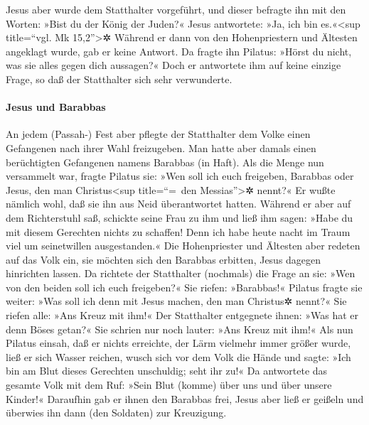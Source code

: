  Jesus aber wurde dem Statthalter vorgeführt, und dieser
befragte ihn mit den Worten: »Bist du der König der Juden?« Jesus
antwortete: »Ja, ich bin es.«\textless sup title=``vgl. Mk
15,2''\textgreater✲  Während er dann von den
Hohenpriestern und Ältesten angeklagt wurde, gab er keine Antwort.
 Da fragte ihn Pilatus: »Hörst du nicht, was sie alles
gegen dich aussagen?«  Doch er antwortete ihm auf keine
einzige Frage, so daß der Statthalter sich sehr verwunderte.

\hypertarget{jesus-und-barabbas}{%
\paragraph{Jesus und Barabbas}\label{jesus-und-barabbas}}

 An jedem (Passah-) Fest aber pflegte der Statthalter dem
Volke einen Gefangenen nach ihrer Wahl freizugeben.  Man
hatte aber damals einen berüchtigten Gefangenen namens Barabbas (in
Haft).  Als die Menge nun versammelt war, fragte Pilatus
sie: »Wen soll ich euch freigeben, Barabbas oder Jesus, den man
Christus\textless sup title=``=~den Messias''\textgreater✲ nennt?«
 Er wußte nämlich wohl, daß sie ihn aus Neid
überantwortet hatten.  Während er aber auf dem
Richterstuhl saß, schickte seine Frau zu ihm und ließ ihm sagen: »Habe
du mit diesem Gerechten nichts zu schaffen! Denn ich habe heute nacht im
Traum viel um seinetwillen ausgestanden.«  Die
Hohenpriester und Ältesten aber redeten auf das Volk ein, sie möchten
sich den Barabbas erbitten, Jesus dagegen hinrichten lassen.
 Da richtete der Statthalter (nochmals) die Frage an sie:
»Wen von den beiden soll ich euch freigeben?« Sie riefen: »Barabbas!«
 Pilatus fragte sie weiter: »Was soll ich denn mit Jesus
machen, den man Christus✲ nennt?« Sie riefen alle: »Ans Kreuz mit ihm!«
 Der Statthalter entgegnete ihnen: »Was hat er denn Böses
getan?« Sie schrien nur noch lauter: »Ans Kreuz mit ihm!«
 Als nun Pilatus einsah, daß er nichts erreichte, der
Lärm vielmehr immer größer wurde, ließ er sich Wasser reichen, wusch
sich vor dem Volk die Hände und sagte: »Ich bin am Blut dieses Gerechten
unschuldig; seht ihr zu!«  Da antwortete das gesamte Volk
mit dem Ruf: »Sein Blut (komme) über uns und über unsere Kinder!«
 Daraufhin gab er ihnen den Barabbas frei, Jesus aber
ließ er geißeln und überwies ihn dann (den Soldaten) zur Kreuzigung.

